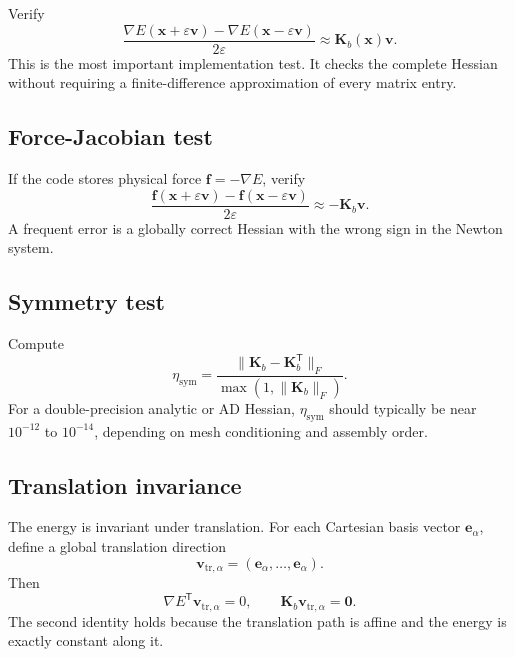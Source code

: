 \documentclass[11pt]{article}
\newcommand{\T}{\mathsf{T}}
\newcommand{\grad}{\nabla}
\newcommand{\zero}{\mathbf{0}}
\newcommand{\x}{\mathbf{x}}
\newcommand{\vct}{\mathbf{v}}
\newcommand{\Kmat}{\mathbf{K}}
\begin{document}
Verify
\begin{equation}
  \frac{\grad E(\x+\varepsilon\vct)-\grad E(\x-\varepsilon\vct)}{2\varepsilon}
  \approx
  \Kmat_b(\x)\vct.
  \label{eq:hessian-test}
\end{equation}
This is the most important implementation test.  It checks the complete Hessian without requiring a finite-difference approximation of every matrix entry.

\subsection{Force-Jacobian test}

If the code stores physical force $\mathbf{f}=-\grad E$, verify
\begin{equation}
  \frac{\mathbf{f}(\x+\varepsilon\vct)-\mathbf{f}(\x-\varepsilon\vct)}{2\varepsilon}
  \approx
  -\Kmat_b\vct.
\end{equation}
A frequent error is a globally correct Hessian with the wrong sign in the Newton system.

\subsection{Symmetry test}

Compute
\begin{equation}
  \eta_{\mathrm{sym}}
  =\frac{\|\Kmat_b-\Kmat_b^\T\|_F}
         {\max(1,\|\Kmat_b\|_F)}.
\end{equation}
For a double-precision analytic or AD Hessian, $\eta_{\mathrm{sym}}$ should typically be near $10^{-12}$ to $10^{-14}$, depending on mesh conditioning and assembly order.

\subsection{Translation invariance}

The energy is invariant under translation.  For each Cartesian basis vector $\mathbf{e}_\alpha$, define a global translation direction
\begin{equation}
  \vct_{\mathrm{tr},\alpha}
  =(\mathbf{e}_\alpha,\ldots,\mathbf{e}_\alpha).
\end{equation}
Then
\begin{equation}
  \grad E^\T\vct_{\mathrm{tr},\alpha}=0,
  \qquad
  \Kmat_b\vct_{\mathrm{tr},\alpha}=\zero.
\end{equation}
The second identity holds because the translation path is affine and the energy is exactly constant along it.
\end{document}
